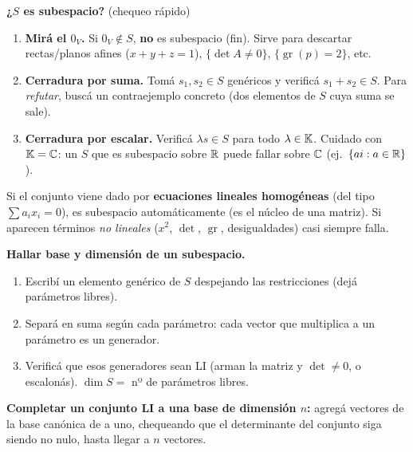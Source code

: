 \begin{receta}
\textbf{¿$S$ es subespacio?} (chequeo rápido)
\begin{enumerate}
\item \textbf{Mirá el $0_V$.} Si $0_V\notin S$, \textbf{no} es subespacio (fin). Sirve para descartar rectas/planos afines ($x+y+z=1$), $\{\det A\neq0\}$, $\{\operatorname{gr}(p)=2\}$, etc.
\item \textbf{Cerradura por suma.} Tomá $s_1,s_2\in S$ genéricos y verificá $s_1+s_2\in S$. Para \emph{refutar}, buscá un contraejemplo concreto (dos elementos de $S$ cuya suma se sale).
\item \textbf{Cerradura por escalar.} Verificá $\lambda s\in S$ para todo $\lambda\in\mathbb{K}$. Cuidado con $\mathbb{K}=\mathbb{C}$: un $S$ que es subespacio sobre $\mathbb{R}$ puede fallar sobre $\mathbb{C}$ (ej.\ $\{ai:a\in\mathbb{R}\}$).
\end{enumerate}
Si el conjunto viene dado por \textbf{ecuaciones lineales homogéneas} (del tipo $\sum a_i x_i=0$), es subespacio automáticamente (es el núcleo de una matriz). Si aparecen términos \emph{no lineales} ($x^2$, $\det$, $\operatorname{gr}$, desigualdades) casi siempre falla.

\smallskip
\textbf{Hallar base y dimensión de un subespacio.}
\begin{enumerate}
\item Escribí un elemento genérico de $S$ despejando las restricciones (dejá parámetros libres).
\item Separá en suma según cada parámetro: cada vector que multiplica a un parámetro es un generador.
\item Verificá que esos generadores sean LI (arman la matriz y $\det\neq0$, o escalonás). $\dim S=$ nº de parámetros libres.
\end{enumerate}
\textbf{Completar un conjunto LI a una base de dimensión $n$:} agregá vectores de la base canónica de a uno, chequeando que el determinante del conjunto siga siendo no nulo, hasta llegar a $n$ vectores.
\end{receta}

